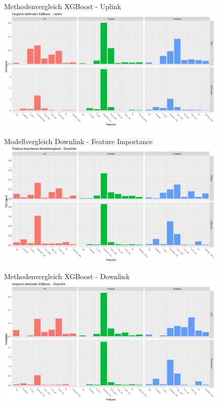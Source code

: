\begin{frame}{Methodenvergleich XGBoost - Uplink}
\includegraphics[width = 11cm]{plots/gainvspermutation_uplink}
\end{frame}

\begin{frame}{Modellvergleich Downlink - Feature Importance}
\includegraphics[width = 11cm]{plots/feature_importance_modellvergleich_downlink}
\end{frame}


\begin{frame}{Methodenvergleich XGBoost - Downlink}
\includegraphics[width = 11cm]{plots/gainvspermutation_downlink}
\end{frame}






